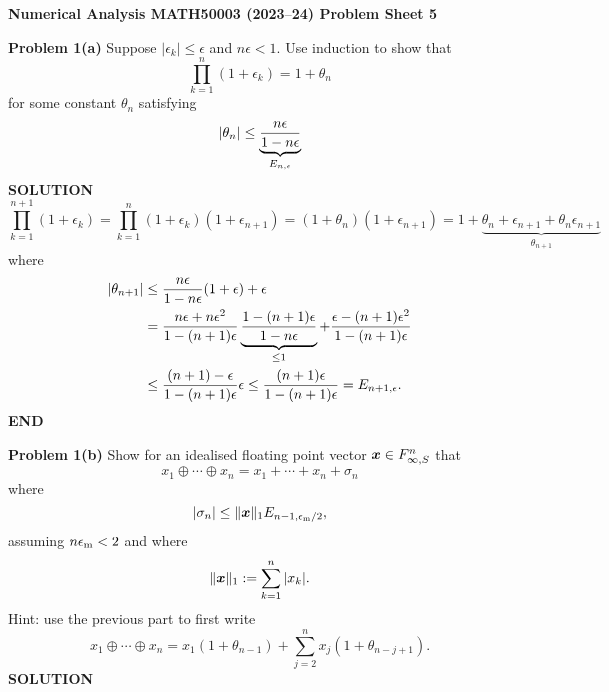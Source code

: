 \documentclass[12pt,a4paper]{article}
\def\endash{–}
\def\x{ {\vc x} }
\begin{document}
\textbf{Numerical Analysis MATH50003 (2023\ensuremath{\endash}24) Problem Sheet 5}

\textbf{Problem 1(a)}  Suppose $|\ensuremath{\epsilon}_k| \ensuremath{\leq} \ensuremath{\epsilon}$ and $n \ensuremath{\epsilon} < 1$. Use induction to show that
\[
\ensuremath{\prod}_{k=1}^n (1+\ensuremath{\epsilon}_k) = 1+\ensuremath{\theta}_n
\]
for some constant $\ensuremath{\theta}_n$ satisfying
\[
|\ensuremath{\theta}_n| \ensuremath{\leq} \underbrace{n \ensuremath{\epsilon} \over 1-n\ensuremath{\epsilon}}_{E_{n,\ensuremath{\epsilon}}}
\]
\textbf{SOLUTION}
\[
\ensuremath{\prod}_{k=1}^{n+1} (1+\ensuremath{\epsilon}_k) = \ensuremath{\prod}_{k=1}^n (1+\ensuremath{\epsilon}_k) (1+\ensuremath{\epsilon}_{n+1}) = (1+\ensuremath{\theta}_n)(1+\ensuremath{\epsilon}_{n+1}) = 1 + \underbrace{\ensuremath{\theta}_n + \ensuremath{\epsilon}_{n+1} + \ensuremath{\theta}_n\ensuremath{\epsilon}_{n+1}}_{\ensuremath{\theta}_{n+1}}
\]
where
\begin{align*}
|\ensuremath{\theta}_{n+1}| &\ensuremath{\leq} {n \ensuremath{\epsilon} \over 1-n\ensuremath{\epsilon}}(1+\ensuremath{\epsilon}) + \ensuremath{\epsilon} \\
&={n \ensuremath{\epsilon} + n \ensuremath{\epsilon}^2 \over 1-(n+1)\ensuremath{\epsilon}} \underbrace{{1-(n+1)\ensuremath{\epsilon} \over 1-n\ensuremath{\epsilon}}}_{\ensuremath{\leq} 1}  + {\ensuremath{\epsilon}-(n+1)\ensuremath{\epsilon}^2 \over 1-(n+1)\ensuremath{\epsilon}} \\
&\ensuremath{\leq} {(n+1)  -  \ensuremath{\epsilon} \over 1-(n+1)\ensuremath{\epsilon}} \ensuremath{\epsilon} \ensuremath{\leq} {(n+1) \ensuremath{\epsilon} \over 1-(n+1)\ensuremath{\epsilon}} = E_{n+1,\ensuremath{\epsilon}}.
\end{align*}
\textbf{END}

\textbf{Problem 1(b)} Show for an idealised floating point vector $\ensuremath{\bm{\x}} \ensuremath{\in} F_{\ensuremath{\infty},S}^n$  that
\[
x_1 \ensuremath{\oplus} \ensuremath{\cdots} \ensuremath{\oplus} x_n = x_1 +  \ensuremath{\cdots} + x_n + \ensuremath{\sigma}_n
\]
where
\[
|\ensuremath{\sigma}_n| \ensuremath{\leq} \| \ensuremath{\bm{\x}} \|_1 E_{n-1,\ensuremath{\epsilon}_{\rm m}/2},
\]
assuming $n \ensuremath{\epsilon}_{\rm m} < 2$ and where
\[
\|\ensuremath{\bm{\x}}\|_1 := \ensuremath{\sum}_{k=1}^n |x_k|.
\]
Hint: use the previous part to first write
\[
x_1 \ensuremath{\oplus} \ensuremath{\cdots} \ensuremath{\oplus} x_n = x_1(1+\ensuremath{\theta}_{n-1}) + \ensuremath{\sum}_{j=2}^n x_j (1 + \ensuremath{\theta}_{n-j+1}).
\]
\textbf{SOLUTION}
\end{document}
